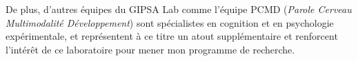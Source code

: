 \documentclass[a4paper]{article}
\begin{document}
De plus, d'autres équipes du GIPSA Lab comme l'équipe PCMD (\emph{Parole
Cerveau Multimodalité Développement}) sont spécialistes en cognition et en
psychologie expérimentale, et représentent à ce titre un atout supplémentaire et
renforcent l'intérêt de ce laboratoire pour mener mon programme de recherche.

\printbibliography
\end{document}

